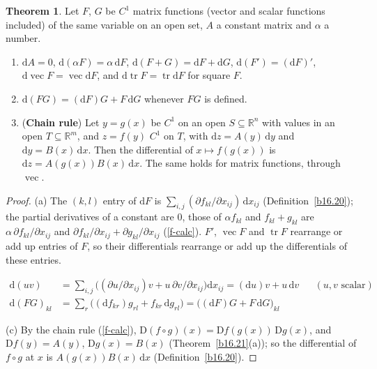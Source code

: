 \documentclass[12pt]{article}
\newcommand{\R}{\mathbb R}
\DeclareMathOperator{\tr}{tr}
\theoremstyle{definition}
\newtheorem{theorem}{Theorem}
\newcommand{\boardtop}{\vspace*{-\abovedisplayskip}}
\DeclareMathOperator{\vecop}{vec}
\begin{document}
\begin{theorem}\label{b16.22}
Let \(F\), \(G\) be \(C^1\) matrix functions (vector and scalar functions included) of the same variable on an open set,
\(A\) a constant matrix and \(\alpha\) a number.
\begin{enumerate}
\item \(\mathrm{d}A=0\), \(\mathrm{d}(\alpha F)=\alpha\,\mathrm{d}F\), \(\mathrm{d}(F+G)=\mathrm{d}F+\mathrm{d}G\),
\(\mathrm{d}(F')=(\mathrm{d}F)'\), \(\mathrm{d}\vecop F=\vecop\mathrm{d}F\), and \(\mathrm{d}\tr F=\tr\mathrm{d}F\) for
square \(F\).
\item \(\mathrm{d}(FG)=(\mathrm{d}F)G+F\,\mathrm{d}G\) whenever \(FG\) is defined.
\item (\textbf{Chain rule}) Let \(y=g(x)\) be \(C^1\) on an open \(S\subseteq\R^n\) with values in an open
\(T\subseteq\R^m\), and \(z=f(y)\) \(C^1\) on \(T\), with \(\mathrm{d}z=A(y)\,\mathrm{d}y\) and
\(\mathrm{d}y=B(x)\,\mathrm{d}x\). Then the differential of \(x\mapsto f(g(x))\) is
\(\mathrm{d}z=A(g(x))B(x)\,\mathrm{d}x\). The same holds for matrix functions, through \(\vecop\).
\end{enumerate}
\end{theorem}
\begin{proof}
(a) The \((k,l)\) entry of \(\mathrm{d}F\) is \(\sum_{i,j}(\partial f_{kl}/\partial x_{ij})\,\mathrm{d}x_{ij}\)
(Definition~\ref{b16.20}); the partial derivatives of a constant are \(0\), those of \(\alpha f_{kl}\) and
\(f_{kl}+g_{kl}\) are \(\alpha\,\partial f_{kl}/\partial x_{ij}\) and \(\partial f_{kl}/\partial x_{ij}+\partial
g_{kl}/\partial x_{ij}\) (\ref{f-calc}). \(F'\), \(\vecop F\) and \(\tr F\) rearrange or add up entries of \(F\), so their
differentials rearrange or add up the differentials of these entries.
\begin{board}[(b) The product rule of \ref{f-calc}; \((FG)_{kl}=\sum_rf_{kr}g_{rl}\) and (a):]
\boardtop
\begin{align*}
\mathrm{d}(uv)&=\textstyle\sum_{i,j}\bigl((\partial u/\partial x_{ij})v+u\,\partial v/\partial x_{ij}\bigr)\mathrm{d}x_{ij}
=(\mathrm{d}u)v+u\,\mathrm{d}v&&(u,v\text{ scalar})\\
\mathrm{d}(FG)_{kl}&=\textstyle\sum_r\bigl((\mathrm{d}f_{kr})g_{rl}+f_{kr}\,\mathrm{d}g_{rl}\bigr)
=\bigl((\mathrm{d}F)G+F\,\mathrm{d}G\bigr)_{kl}
\end{align*}
\end{board}
(c) By the chain rule (\ref{f-calc}), \(\mathrm D(f\circ g)(x)=\mathrm Df(g(x))\,\mathrm Dg(x)\), and
\(\mathrm Df(y)=A(y)\), \(\mathrm Dg(x)=B(x)\) (Theorem~\ref{b16.21}(a)); so the differential of \(f\circ g\) at \(x\) is
\(A(g(x))B(x)\,\mathrm{d}x\) (Definition~\ref{b16.20}).
\end{proof}
\end{document}
